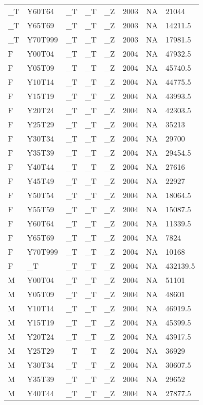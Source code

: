 \begin{longtable}[t]{llllllll}
\addlinespace
\_T & Y60T64 & \_T & \_T & \_Z & 2003 & NA & 21044\\
\_T & Y65T69 & \_T & \_T & \_Z & 2003 & NA & 14211.5\\
\_T & Y70T999 & \_T & \_T & \_Z & 2003 & NA & 17981.5\\
F & Y00T04 & \_T & \_T & \_Z & 2004 & NA & 47932.5\\
F & Y05T09 & \_T & \_T & \_Z & 2004 & NA & 45740.5\\
\addlinespace
F & Y10T14 & \_T & \_T & \_Z & 2004 & NA & 44775.5\\
F & Y15T19 & \_T & \_T & \_Z & 2004 & NA & 43993.5\\
F & Y20T24 & \_T & \_T & \_Z & 2004 & NA & 42303.5\\
F & Y25T29 & \_T & \_T & \_Z & 2004 & NA & 35213\\
F & Y30T34 & \_T & \_T & \_Z & 2004 & NA & 29700\\
\addlinespace
F & Y35T39 & \_T & \_T & \_Z & 2004 & NA & 29454.5\\
F & Y40T44 & \_T & \_T & \_Z & 2004 & NA & 27616\\
F & Y45T49 & \_T & \_T & \_Z & 2004 & NA & 22927\\
F & Y50T54 & \_T & \_T & \_Z & 2004 & NA & 18064.5\\
F & Y55T59 & \_T & \_T & \_Z & 2004 & NA & 15087.5\\
\addlinespace
F & Y60T64 & \_T & \_T & \_Z & 2004 & NA & 11339.5\\
F & Y65T69 & \_T & \_T & \_Z & 2004 & NA & 7824\\
F & Y70T999 & \_T & \_T & \_Z & 2004 & NA & 10168\\
F & \_T & \_T & \_T & \_Z & 2004 & NA & 432139.5\\
M & Y00T04 & \_T & \_T & \_Z & 2004 & NA & 51101\\
\addlinespace
M & Y05T09 & \_T & \_T & \_Z & 2004 & NA & 48601\\
M & Y10T14 & \_T & \_T & \_Z & 2004 & NA & 46919.5\\
M & Y15T19 & \_T & \_T & \_Z & 2004 & NA & 45399.5\\
M & Y20T24 & \_T & \_T & \_Z & 2004 & NA & 43917.5\\
M & Y25T29 & \_T & \_T & \_Z & 2004 & NA & 36929\\
\addlinespace
M & Y30T34 & \_T & \_T & \_Z & 2004 & NA & 30607.5\\
M & Y35T39 & \_T & \_T & \_Z & 2004 & NA & 29652\\
M & Y40T44 & \_T & \_T & \_Z & 2004 & NA & 27877.5\\

\end{longtable}
